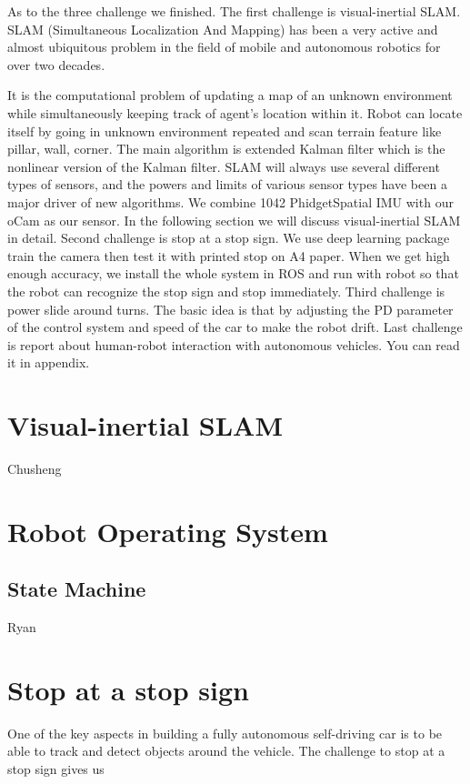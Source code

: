 \documentclass[a4paper, 10pt, conference]{ieeeconf}      %
\begin{document}
As to the three challenge we finished. The first challenge is visual-inertial SLAM. SLAM (Simultaneous Localization And Mapping) has been a very active and almost ubiquitous problem in the field of mobile and autonomous robotics for over two decades\cite{roslam}.

It is the computational problem of updating a map of an unknown environment while simultaneously keeping track of agent’s location within it. Robot can locate itself by going in unknown environment repeated and scan terrain feature like pillar, wall, corner. The main algorithm is extended Kalman filter which is the nonlinear version of the Kalman filter. SLAM will always use several different types of sensors, and the powers and limits of various sensor types have been a major driver of new algorithms\cite{csvslam}. We combine 1042 PhidgetSpatial IMU with our oCam as our sensor. In the following section we will discuss visual-inertial SLAM in detail. Second challenge is stop at a stop sign. We use deep learning package train the camera then test it with printed stop on A4 paper. When we get high enough accuracy, we install the whole system in ROS and run with robot so that the robot can recognize the stop sign and stop immediately. Third challenge is power slide around turns. The basic idea is that by adjusting the PD parameter of the control system and speed of the car to make the robot drift. Last challenge is report about human-robot interaction with autonomous vehicles. You can read it in appendix.

\section{Visual-inertial SLAM}
Chusheng

\section{Robot Operating System}

\subsection{State Machine}

Ryan

\section{Stop at a stop sign}
One of the key aspects in building a fully autonomous self-driving car is to be able to track and detect objects around the vehicle. The challenge to stop at a stop sign gives us 
\end{document}
